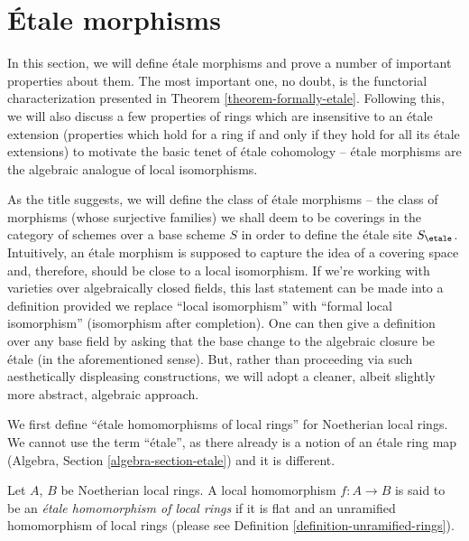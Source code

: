 \section{\'Etale morphisms}
\label{section-etale-morphisms}

\noindent
In this section, we will define \'etale morphisms and prove a number of
important properties about them. The most important one, no doubt, is the
functorial characterization presented in Theorem \ref{theorem-formally-etale}.
Following this, we will also discuss a few properties of rings which are
insensitive to an \'etale extension (properties which hold for a ring
if and only if they hold for all its \'etale extensions) to motivate the basic
tenet of \'etale cohomology -- \'etale morphisms are the algebraic analogue of
local isomorphisms.

\medskip\noindent
As the title suggests, we will define the class of \'etale morphisms -- the
class of morphisms (whose surjective families) we shall deem to be coverings
in the category of schemes over a base scheme $S$ in order to define the
\'etale site $S_\etale$. Intuitively, an \'etale morphism is supposed
to capture the idea of a covering space and, therefore, should be close to a
local isomorphism. If we're working with varieties over algebraically closed
fields, this last statement can be made into a definition provided we replace
``local isomorphism'' with ``formal local isomorphism'' (isomorphism after
completion). One can then give a definition over any base field by asking
that the base change to the algebraic closure be \'etale (in the
aforementioned sense). But, rather than proceeding via such aesthetically
displeasing constructions, we will adopt a cleaner, albeit slightly more
abstract, algebraic approach.

\medskip\noindent
We first define ``\'etale homomorphisms of local rings'' for Noetherian
local rings. We cannot use the term ``\'etale'', as there already
is a notion of an \'etale ring map
(Algebra, Section \ref{algebra-section-etale})
and it is different.

\begin{definition}
\label{definition-etale-ring}
Let $A$, $B$ be Noetherian local rings.
A local homomorphism $f : A \to B$ is said to be an
{\it \'etale homomorphism of local rings}
if it is flat and an unramified homomorphism of local rings
(please see Definition \ref{definition-unramified-rings}).
\end{definition}

